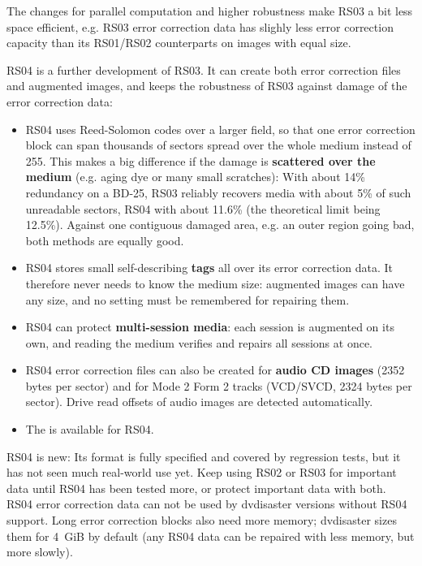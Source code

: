 The changes for parallel computation and higher robustness make RS03 a bit less space efficient, 
e.g. RS03 error correction data has slighly less error correction capacity than 
its RS01/RS02 counterparts on images with equal size.

\smallskip

RS04 is a further development of RS03. It can create both error correction files and
augmented images, and keeps the robustness of RS03 against damage of the error correction data:

\begin{itemize}
\item RS04 uses Reed-Solomon codes over a larger field, so that one error correction block
can span thousands of sectors spread over the whole medium instead of 255. This makes a big
difference if the damage is {\bf scattered over the medium} (e.g. aging dye or many small scratches):
With about 14\% redundancy on a BD-25, RS03 reliably recovers media with about 5\% of such
unreadable sectors, RS04 with about 11.6\% (the theoretical limit being 12.5\%).
Against one contiguous damaged area, e.g. an outer region going bad, both methods are equally good.
\item RS04 stores small self-describing {\bf tags} all over its error correction data. It therefore
never needs to know the medium size: augmented images can have any size, and no setting must be
remembered for repairing them.
\item RS04 can protect {\bf multi-session media}: each session is augmented on its own, and reading the
medium verifies and repairs all sessions at once.
\item RS04 error correction files can also be created for {\bf audio CD images} (2352 bytes per sector)
and for Mode 2 Form 2 tracks (VCD/SVCD, 2324 bytes per sector). Drive read offsets of audio
images are detected automatically.
\item The  is available for RS04.
\end{itemize}

RS04 is new: Its format is fully specified and covered by regression tests, but it has not seen much
real-world use yet. Keep using RS02 or RS03 for important data until RS04 has been tested more,
or protect important data with both. RS04 error correction data can not be used by dvdisaster versions
without RS04 support. Long error correction blocks also need more memory; dvdisaster sizes them for
4~GiB by default (any RS04 data can be repaired with less memory, but more slowly).

